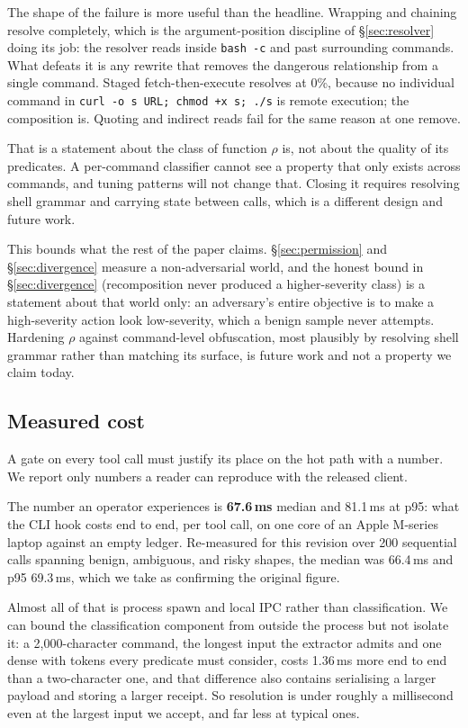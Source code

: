 \documentclass[10pt]{article}
\begin{document}
The shape of the failure is more useful than the headline. Wrapping and chaining
resolve completely, which is the argument-position discipline of \S\ref{sec:resolver}
doing its job: the resolver reads inside \texttt{bash -c} and past surrounding
commands. What defeats it is any rewrite that removes the dangerous relationship from
a single command. Staged fetch-then-execute resolves at 0\%, because no individual
command in \texttt{curl -o s URL; chmod +x s; ./s} is remote execution; the
composition is. Quoting and indirect reads fail for the same reason at one remove.

That is a statement about the class of function $\rho$ is, not about the quality of
its predicates. A per-command classifier cannot see a property that only exists
across commands, and tuning patterns will not change that. Closing it requires
resolving shell grammar and carrying state between calls, which is a different design
and future work.

This bounds what the rest of the paper claims. \S\ref{sec:permission} and
\S\ref{sec:divergence} measure a non-adversarial world, and the honest bound in
\S\ref{sec:divergence} (recomposition never produced a higher-severity class) is a
statement about that world only: an adversary's entire objective is to make a
high-severity action look low-severity, which a benign sample never attempts.
Hardening $\rho$ against command-level obfuscation, most plausibly by resolving
shell grammar rather than matching its surface, is future work and not a property we
claim today.

\subsection{Measured cost}

A gate on every tool call must justify its place on the hot path with a number. We
report only numbers a reader can reproduce with the released client.

The number an operator experiences is \textbf{67.6\,ms} median and 81.1\,ms at p95:
what the CLI hook costs end to end, per tool call, on one core of an Apple M-series
laptop against an empty ledger. Re-measured for this revision over 200 sequential
calls spanning benign, ambiguous, and risky shapes, the median was 66.4\,ms and p95
69.3\,ms, which we take as confirming the original figure.

Almost all of that is process spawn and local IPC rather than classification. We can
bound the classification component from outside the process but not isolate it: a
2{,}000-character command, the longest input the extractor admits and one dense with
tokens every predicate must consider, costs 1.36\,ms more end to end than a
two-character one, and that difference also contains serialising a larger payload and
storing a larger receipt. So resolution is under roughly a millisecond even at the
largest input we accept, and far less at typical ones.
\end{document}
